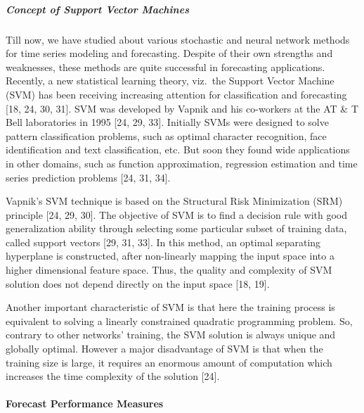 \documentclass[
  letterpaper,
  DIV=11,
  numbers=noendperiod]{scrartcl}
\let\oldparagraph\paragraph
\renewcommand{\paragraph}[1]{\oldparagraph{#1}\mbox{}}
\let\oldsubparagraph\subparagraph
\renewcommand{\subparagraph}[1]{\oldsubparagraph{#1}\mbox{}}
\begin{document}
\hypertarget{concept-of-support-vector-machines}{%
\subparagraph{\texorpdfstring{\textbf{Concept of Support Vector
Machines}}{Concept of Support Vector Machines}}\label{concept-of-support-vector-machines}}

Till now, we have studied about various stochastic and neural network
methods for time series modeling and forecasting. Despite of their own
strengths and weaknesses, these methods are quite successful in
forecasting applications. Recently, a new statistical learning theory,
viz.~the Support Vector Machine (SVM) has been receiving increasing
attention for classification and forecasting {[}18, 24, 30, 31{]}. SVM
was developed by Vapnik and his co-workers at the AT \& T Bell
laboratories in 1995 {[}24, 29, 33{]}. Initially SVMs were designed to
solve pattern classification problems, such as optimal character
recognition, face identification and text classification, etc. But soon
they found wide applications in other domains, such as function
approximation, regression estimation and time series prediction problems
{[}24, 31, 34{]}.

Vapnik's SVM technique is based on the Structural Risk Minimization
(SRM) principle {[}24, 29, 30{]}. The objective of SVM is to find a
decision rule with good generalization ability through selecting some
particular subset of training data, called support vectors {[}29, 31,
33{]}. In this method, an optimal separating hyperplane is constructed,
after non-linearly mapping the input space into a higher dimensional
feature space. Thus, the quality and complexity of SVM solution does not
depend directly on the input space {[}18, 19{]}.

Another important characteristic of SVM is that here the training
process is equivalent to solving a linearly constrained quadratic
programming problem. So, contrary to other networks' training, the SVM
solution is always unique and globally optimal. However a major
disadvantage of SVM is that when the training size is large, it requires
an enormous amount of computation which increases the time complexity of
the solution {[}24{]}.

\hypertarget{forecast-performance-measures}{%
\paragraph{Forecast Performance
Measures}\label{forecast-performance-measures}}
\end{document}
